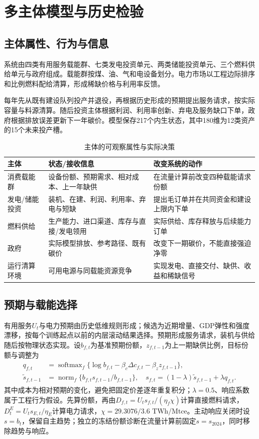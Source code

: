 \section{多主体模型与历史检验}
\subsection{主体属性、行为与信息}
系统由四类有用服务载能群、七类发电投资单元、两类储能投资单元、三个燃料供给单元与政府组成。载能群按煤、油、气和电设备划分。电力市场以工程边际排序和比例燃料配给清算，形成稀缺价格与利用率反馈。

每年先从既有建设队列投产并退役，再根据历史形成的预期提出服务请求，按实际容量与料源清算。随后投资主体根据利润、利用率创新、弃电及服务缺口下单，政府根据排放误差更新下一年碳价。模型保存217个内生状态，其中180维为12类资产的15个未来投产槽。



\begin{table}[!htbp]\centering\small\caption{主体的可观察属性与实际决策}\begin{tabularx}{\textwidth}{lXX}
\toprule
主体 & 状态/接收信息 & 改变系统的动作 \\\midrule
消费载能群 & 设备份额、预期需求、相对成本、上一年缺供 & 在流量计算前改变四种载能请求份额 \\
发电/储能投资 & 装机、在建、利润、利用率、弃电与短缺 & 提出毛订单并在共同资金和建设上限内下单 \\
燃料供给 & 生产能力、进口渠道、库存与直接/发电领用 & 实际供给、库存释放与后续能力订单 \\
政府 & 实际模型排放、参考路径、既有碳价 & 改变下一期碳价，不能直接强迫净零 \\
运行清算环境 & 可用电源与同载能资源竞争 & 实现发电、直接交付、缺供、收益和稀缺信号 \\
\bottomrule
\end{tabularx}
\end{table}

\subsection{预期与载能选择}
有用服务$U_t$与电力预期由历史低维规则形成；候选为近期增量、GDP弹性和强度漂移，按每个训练起点以前的内层滚动结果选择。预期形成服务请求，装机与供给随后按物理状态实现。设$b_{f,t}$为基准预期份额，$z_{f,t-1}$为上一期缺供比例，目标份额与调整为
\begin{align}
q_{f,t}&=\operatorname{softmax}_f\{\log b_{f,t}-\beta_c\Delta c_{f,t}-\beta_z z_{f,t-1}\},\\
\tilde s_{f,t-1}&=\operatorname{norm}_f\{b_{f,t}s_{f,t-1}/b_{f,t-1}\},\quad
s_{f,t}=(1-\lambda)\tilde s_{f,t-1}+\lambda q_{f,t}.
\end{align}
其中成本为相对预期的变化，避免把固定价差逐年重复积分；$\lambda=0.5$、响应系数属于工程行为假设。先算份额，再由$D_{f,t}=U_ts_{f,t}/(\eta_f\chi)$计算直接燃料请求，$D^E_t=U_ts_{E,t}/\eta_E$计算电力请求，$\chi=29.3076/3.6$ TWh/Mtce。主动响应关闭时设$s=b_t$，保留自主趋势；独立的冻结份额诊断在流量计算前固定$s=s_{2024}$，同时移除趋势与响应。

